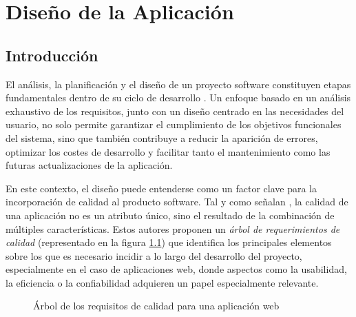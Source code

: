 \chapter{Diseño de la Aplicación}
\label{cap:disenoDeLaAplicacion}

\section{Introducción}

El análisis, la planificación y el diseño de un proyecto software constituyen etapas fundamentales dentro de su ciclo de desarrollo \citep{Pressman_2010}. Un enfoque basado en un análisis exhaustivo de los requisitos, junto con un diseño centrado en las necesidades del usuario, no solo permite garantizar el cumplimiento de los objetivos funcionales del sistema, sino que también contribuye a reducir la aparición de errores, optimizar los costes de desarrollo y facilitar tanto el mantenimiento como las futuras actualizaciones de la aplicación.

En este contexto, el diseño puede entenderse como un factor clave para la incorporación de calidad al producto software. Tal y como señalan \cite{Olsina_Lafuente_Rossi_2001}, la calidad de una aplicación no es un atributo único, sino el resultado de la combinación de múltiples características. Estos autores proponen un \textit{árbol de requerimientos de calidad} (representado en la figura \ref{fig:Elementos de calidad para una aplicación web}) que identifica los principales elementos sobre los que es necesario incidir a lo largo del desarrollo del proyecto, especialmente en el caso de aplicaciones web, donde aspectos como la usabilidad, la eficiencia o la confiabilidad adquieren un papel especialmente relevante.

\begin{figure}[ht]
\centering
\hspace*{-1.2cm}
\caption{Árbol de los requisitos de calidad para una aplicación web}
\label{fig:Elementos de calidad para una aplicación web}
\end{figure}

